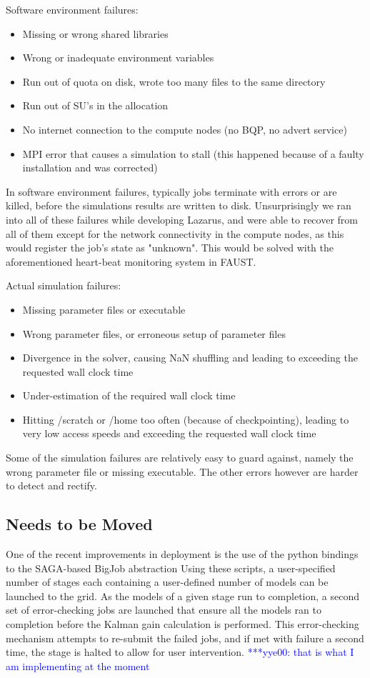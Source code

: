 \documentclass[conference,final]{IEEEtran}
\newcommand{\jhanote}[1]{ {\textcolor{red} { ***Jha: #1 }}}
\newcommand{\yyenote}[1]{ {\textcolor{blue} { ***yye00: #1 }}}
\newcommand{\jhanote}[1]{}
\newcommand{\yyenote}[1]{}
\begin{document}
Software environment failures:
\begin{itemize}
\item{Missing or wrong shared libraries}
\item{Wrong or inadequate environment variables}
\item{Run out of quota on disk, wrote too many files to the same directory}
\item{Run out of SU's in the allocation}
\item{No internet connection to the compute nodes (no BQP, no advert service)}
\item{MPI error that causes a simulation to stall (this happened because of a faulty installation and was corrected)}
\end{itemize}
In software environment failures, typically jobs terminate with errors
or are killed, before the simulations results are written to
disk. Unsurprisingly we ran into all of these failures while
developing Lazarus, and were able to recover from all of them except
for the network connectivity in the compute nodes, as this would
register the job's state as "unknown". This would be solved with the
aforementioned heart-beat monitoring system in FAUST.

Actual simulation failures:
\begin{itemize}
\item{Missing parameter files or executable}
\item{Wrong parameter files, or erroneous setup of parameter files}
\item{Divergence in the solver, causing NaN shuffling and leading to exceeding the requested wall clock time}
\item{Under-estimation of the required wall clock time}
\item{Hitting /scratch or /home too often (because of checkpointing), leading to very low access speeds and exceeding the requested wall clock time}
\end{itemize}
Some of the simulation failures are relatively easy to guard against,
namely the wrong parameter file or missing executable. The other errors
however are harder to detect and rectify.

\subsection{Needs to be Moved}
One of the recent improvements in deployment is the use of the python
bindings to the SAGA-based BigJob abstraction %
Using these scripts, a user-specified number of stages each containing
a user-defined number of models can be launched to the grid. As the
models of a given stage run to completion, a second set of
error-checking jobs are launched that ensure all the models ran to
completion before the Kalman gain calculation is performed. This
error-checking mechanism attempts to re-submit the failed jobs, and if
met with failure a second time, the stage is halted to allow for user
intervention. \yyenote{that is what I am implementing at the moment}
\end{document}
